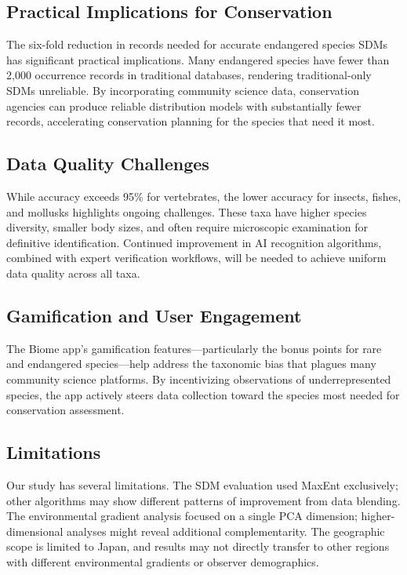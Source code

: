\documentclass[11pt]{article}
\begin{document}
\subsection{Practical Implications for Conservation}

The six-fold reduction in records needed for accurate endangered species SDMs has significant practical implications. Many endangered species have fewer than 2,000 occurrence records in traditional databases, rendering traditional-only SDMs unreliable. By incorporating community science data, conservation agencies can produce reliable distribution models with substantially fewer records, accelerating conservation planning for the species that need it most.

\subsection{Data Quality Challenges}

While accuracy exceeds 95\% for vertebrates, the lower accuracy for insects, fishes, and mollusks highlights ongoing challenges. These taxa have higher species diversity, smaller body sizes, and often require microscopic examination for definitive identification. Continued improvement in AI recognition algorithms, combined with expert verification workflows, will be needed to achieve uniform data quality across all taxa.

\subsection{Gamification and User Engagement}

The Biome app's gamification features---particularly the bonus points for rare and endangered species---help address the taxonomic bias that plagues many community science platforms. By incentivizing observations of underrepresented species, the app actively steers data collection toward the species most needed for conservation assessment.

\subsection{Limitations}

Our study has several limitations. The SDM evaluation used MaxEnt exclusively; other algorithms may show different patterns of improvement from data blending. The environmental gradient analysis focused on a single PCA dimension; higher-dimensional analyses might reveal additional complementarity. The geographic scope is limited to Japan, and results may not directly transfer to other regions with different environmental gradients or observer demographics.
\end{document}

